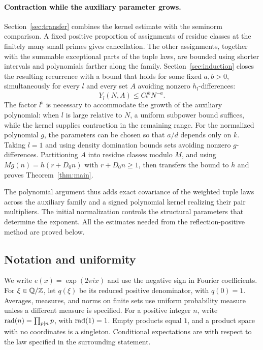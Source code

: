 \paragraph{Contraction while the auxiliary parameter grows.}
Section~\ref{sec:transfer} combines the kernel estimate with the seminorm
comparison. A fixed positive proportion of assignments of residue classes
at the finitely many small primes gives cancellation. The other assignments,
together with the summable exceptional parts of the tuple laws, are bounded
using shorter intervals and polynomials farther along the family.
Section~\ref{sec:induction} closes the resulting recurrence with a bound
that holds for some fixed $a,b>0$, simultaneously for every $l$ and every set $A$
avoiding nonzero $h_l$-differences:
\[
 Y_l(N,A)\le C l^bN^{-a}.
\]
The factor $l^b$ is necessary to accommodate the
growth of the auxiliary polynomial: when $l$ is large relative to $N$, a
uniform subpower bound suffices, while the kernel supplies contraction in
the remaining range. For the normalized polynomial $g$, the parameters can
be chosen so that $a/d$ depends only on $k$. Taking $l=1$ and using density
domination bounds sets avoiding nonzero $g$-differences. Partitioning $A$
into residue classes modulo $M$, and using $Mg(n)=h(r+D_0n)$ with
$r+D_0n\ge1$, then transfers the bound to $h$ and proves
Theorem~\ref{thm:main}.

The polynomial argument thus adds exact covariance of the weighted tuple laws
across the auxiliary family and a signed polynomial kernel realizing their
pair multipliers. The initial normalization controls the structural parameters
that determine the exponent. All the estimates needed from the
reflection-positive method are proved below.

\subsection{Notation and uniformity}

We write $e(x)=\exp(2\pi i x)$ and use the negative sign in Fourier
coefficients. For $\xi\in\mathbb Q/\mathbb Z$, let $q(\xi)$ be its reduced positive
denominator, with $q(0)=1$. Averages, measures, and norms on finite sets use
uniform probability measure unless a different measure is specified.
For a positive integer $n$, write $\operatorname{rad}(n)=\prod_{p\mid n}p$, with
$\operatorname{rad}(1)=1$.
Empty products equal $1$, and a product space with no coordinates is a
singleton. Conditional expectations are with respect to the law specified
in the surrounding statement.

